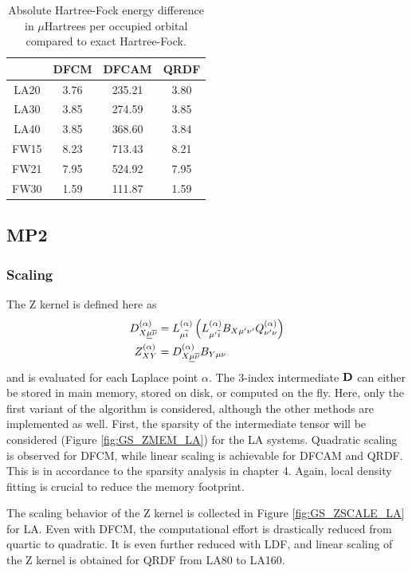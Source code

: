 \begin{table}[h!]
\centering
\begin{tabular}{cccc}
 \hline
 & DFCM & DFCAM & QRDF \\ \hline 
LA20 & 3.76 & 235.21 & 3.80 \\ 
LA30  & 3.85 & 274.59 & 3.85 \\ 
LA40 & 3.85 & 368.60 & 3.84 \\ 
FW15 & 8.23 & 713.43 & 8.21 \\ 
FW21 & 7.95 & 524.92 & 7.95 \\ 
FW30 & 1.59 & 111.87 & 1.59 \\ 
\hline 
\end{tabular}
\caption{Absolute Hartree-Fock energy difference in $\mu$Hartrees per occupied orbital compared to exact Hartree-Fock.}
\label{tab:GSHFACCURACY}
\end{table}

\FloatBarrier

\subsection{MP2}

\subsubsection{Scaling}

The Z kernel is defined here as
\begin{align}
D^{(\alpha)}_{X\underline{\mu}\overline{\nu}} &= L^{(\alpha)}_{\mu\overline{i}} \left( L^{(\alpha)}_{\mu' \overline{i}} B_{X\mu'\nu'}  Q^{(\alpha)}_{\nu'\nu} \right) \\
Z_{XY}^{(\alpha)} &= D^{(\alpha)}_{X\underline{\mu}\overline{\nu}} B_{Y\mu\nu}
\end{align}
\noindent and is evaluated for each Laplace point $\alpha$. The 3-index intermediate $\mathbf{D}$ can either be stored in main memory, stored on disk, or computed on the fly. Here, only the first variant of the algorithm is considered, although the other methods are implemented as well. First, the sparsity of the intermediate tensor will be considered (Figure \ref{fig:GS_ZMEM_LA}) for the LA systems. Quadratic scaling is observed for DFCM, while linear scaling is achievable for DFCAM and QRDF. This is in accordance to the sparsity analysis in chapter 4. Again, local density fitting is crucial to reduce the memory footprint.



The scaling behavior of the Z kernel is collected in Figure \ref{fig:GS_ZSCALE_LA} for LA. Even with DFCM, the computational effort is drastically reduced from quartic to quadratic. It is even further reduced with LDF, and linear scaling of the Z kernel is obtained for QRDF from LA80 to LA160. 

